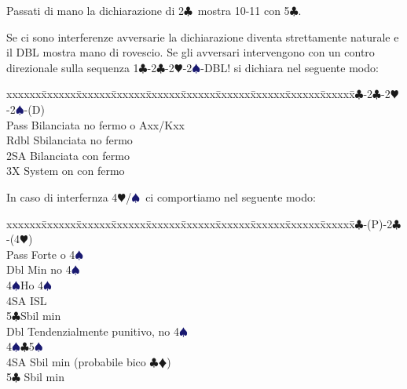 \documentclass[a4paper,italian]{article}
\newcommand{\BC}{\textcolor{OliveGreen}{$\clubsuit$}}
\newcommand{\BD}{\textcolor{RedOrange}{$\vardiamondsuit$}}
\newcommand{\BH}{\textcolor{Red2}{$\varheartsuit${}}}
\newcommand{\BS}{\textcolor{MidnightBlue}{$\spadesuit${}}}
\newenvironment{bidtable}
{\begin{tabbing}

    xxxxxx\=xxxxxx\=xxxxxx\=xxxxxx\=xxxxxx\=xxxxxx\=xxxxxx\=xxxxxx\=xxxxxx\=xxxxxx\=\kill}
{\end{tabbing} }%
\newenvironment{attenzione}[1]
{\begin{tcolorbox}[colframe=red!80!white,title=#1]}
    {
\end{tcolorbox} }%
\begin{document}
                                Passati di mano la dichiarazione di 2\BC\ mostra 10-11 con 5\BC .

                                \bigbreak
                                \begin{attenzione}{Interferenze}
                                    Se ci sono interferenze avversarie la dichiarazione diventa strettamente naturale e il DBL mostra mano di rovescio. Se gli avversari intervengono con un contro direzionale sulla sequenza 1\BC -2\BC -2\BH -2\BS -DBL! si dichiara nel seguente modo:
                                    \bigbreak
                                    \begin{bidtable}
                                        1\BC-2\BC-2\BH-2\BS-(D)\+\\
                                        Pass \> Bilanciata no fermo o Axx/Kxx\\
                                        Rdbl \> Sbilanciata no fermo\\
                                        2SA \> Bilanciata con fermo\\
                                        3X \> System on con fermo\-
                                    \end{bidtable}
                                    In caso di interfernza 4\BH /\BS\ ci comportiamo nel seguente modo:
                                    \bigbreak
                                    \begin{bidtable}
                                        1\BC-(P)-2\BC-(4\BH)\+\\
                                        Pass \> Forte o 4\BS\+\\
                                        Dbl \>Min no 4\BS\ \\
                                        4\BS \>Ho 4\BS\ \\
                                        4SA \> ISL\\
                                        5\BC \>Sbil min\-\\
                                        Dbl \> Tendenzialmente punitivo, no 4\BS \\
                                        4\BS {}\BC 5\BS \\
                                        4SA \> Sbil min (probabile bico \BC \BD )\\
                                        5\BC \> Sbil min\-
                                    \end{bidtable}

\end{attenzione}
\end{document}
